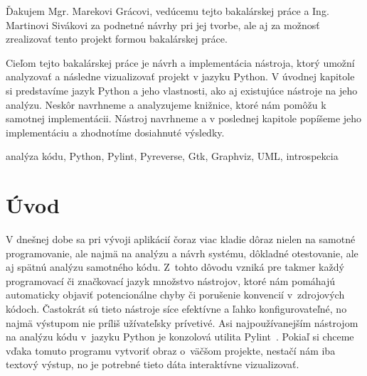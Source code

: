 \documentclass[11pt,oneside,final]{fithesis2}
\begin{document}
 \FrontMatter  
 \ThesisTitlePage

\begin{ThesisDeclaration}
\DeclarationText
\AdvisorName
\end{ThesisDeclaration}

\begin{ThesisThanks}
Ďakujem Mgr. Marekovi Grácovi, vedúcemu tejto bakalárskej práce a Ing. Martinovi Sivákovi za podnetné návrhy pri jej tvorbe, ale aj za možnosť zrealizovať tento projekt formou bakalárskej práce.
\end{ThesisThanks}

\begin{ThesisAbstract}
Cieľom tejto bakalárskej práce je návrh a implementácia nástroja, ktorý umožní analyzovať a následne vizualizovať projekt v jazyku Python. V úvodnej kapitole si predstavíme jazyk Python a jeho vlastnosti, ako aj existujúce nástroje na jeho analýzu. Neskôr navrhneme a analyzujeme knižnice, ktoré nám pomôžu k samotnej implementácii. Nástroj navrhneme a v poslednej kapitole popíšeme jeho implementáciu a zhodnotíme dosiahnuté výsledky.
\end{ThesisAbstract}

\begin{ThesisKeyWords}
analýza kódu, Python, Pylint, Pyreverse, Gtk, Graphviz, UML, introspekcia
\end{ThesisKeyWords}



\MainMatter  
\tableofcontents

\chapter{Úvod}

	V dnešnej dobe sa pri vývoji aplikácií čoraz viac kladie dôraz nielen na samotné programovanie, ale najmä na analýzu a návrh systému, dôkladné otestovanie, ale aj spätnú analýzu samotného kódu. Z~tohto dôvodu vzniká pre takmer každý programovací či značkovací jazyk množstvo nástrojov, ktoré nám pomáhajú automaticky objaviť potencionálne chyby či porušenie konvencií v~zdrojových kódoch. Častokrát sú tieto nástroje síce efektívne a ľahko konfigurovateľné, no najmä výstupom nie príliš užívateľsky prívetivé. Asi najpoužívanejším nástrojom na analýzu kódu v~jazyku Python je konzolová utilita Pylint~\cite{pylint}. Pokiaľ si chceme vďaka tomuto programu vytvoriť obraz o~väčšom projekte, nestačí nám iba textový výstup, no je potrebné tieto dáta interaktívne vizualizovať.
	
\end{document}
